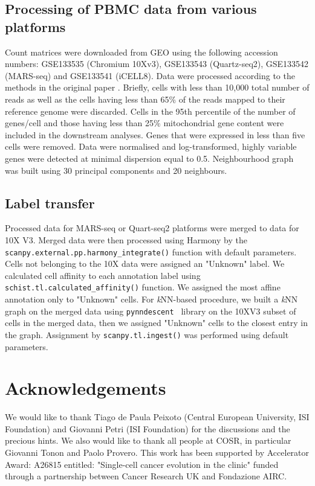 \documentclass[10pt]{article}
\begin{document}
\subsection*{Processing of PBMC data from various platforms}
Count matrices were downloaded from GEO using the following accession numbers: GSE133535 (Chromium 10Xv3), GSE133543 (Quartz-seq2), GSE133542 (MARS-seq) and GSE133541 (iCELL8). Data were processed according to the methods in the original paper \cite{mereu_2020}. Briefly, cells with less than 10,000 total number of reads as well as the cells having less than 65\% of the reads mapped to their reference genome were discarded. Cells in the 95th percentile of the number of genes/cell and those having less than 25\% mitochondrial gene content were included in the downstream analyses. Genes that were expressed in less than five cells were removed. Data were normalised and log-transformed, highly variable genes were detected at minimal dispersion equal to 0.5. Neighbourhood graph was built using 30 principal components and 20 neighbours. 


\subsection*{Label transfer}

Processed data for MARS-seq or Quart-seq2 platforms were merged to data for 10X V3. Merged data were then processed using Harmony \cite{Korsunsky_2019} by the \texttt{scanpy.external.pp.harmony\_integrate()} function with default parameters. Cells not belonging to the 10X data were assigned an "Unknown" label. We calculated cell affinity to each annotation label using \texttt{schist.tl.calculated\_affinity()} function. We assigned the most affine annotation only to "Unknown" cells. For \emph{k}NN-based procedure, we built a \emph{k}NN graph on the merged data using \texttt{pynndescent } library on the 10XV3 subset of cells in the merged data, then we assigned "Unknown" cells to the closest entry in the graph. Assignment by \texttt{scanpy.tl.ingest()} was performed using default parameters.



\section*{Acknowledgements}

We would like to thank Tiago de Paula Peixoto (Central European University, ISI Foundation) and Giovanni Petri (ISI Foundation) for the discussions and the precious hints. We also would like to thank all people at COSR, in particular Giovanni Tonon and Paolo Provero.
This work has been supported by Accelerator Award: A26815 entitled:  "Single-cell cancer evolution in the clinic" funded through a partnership between Cancer Research UK and Fondazione AIRC.





\end{document}

